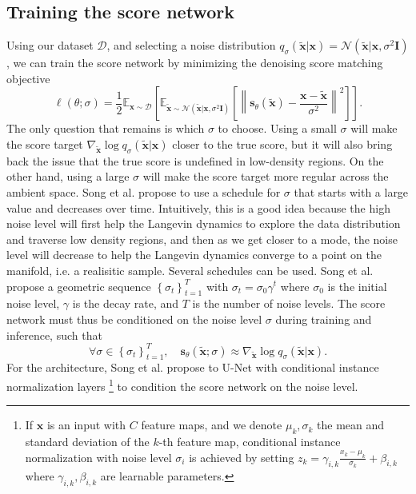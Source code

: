 \documentclass{article}
\begin{document}
\subsection{Training the score network}
Using our dataset $\mathcal{D}$, and selecting a noise distribution $q_\sigma(\tilde {\mathbf{x}}|\mathbf{x}) = \mathcal{N}(\tilde {\mathbf{x}}|\mathbf{x}, \sigma^2 \mathbf{I})$,
we can train the score network by minimizing the denoising score matching objective
\begin{equation}
    \label{eq:score-empirical}
    \ell(\theta; \sigma) = \frac{1}{2} \mathbb{E}_{\mathbf{x}\sim \mathcal{D}} \left[ \mathbb{E}_{\tilde {\mathbf{x}}\sim \mathcal{N}(\tilde {\mathbf{x}}|\mathbf{x}, \sigma^2 \mathbf{I})} \left[ \left\| \mathbf{s}_\theta(\tilde {\mathbf{x}}) - \frac{\mathbf{x} - \tilde {\mathbf{x}}}{\sigma^2} \right\|^2 \right] \right].
\end{equation}
The only question that remains is which $\sigma$ to choose. Using a small $\sigma$ will make the score target $\nabla_{\tilde {\mathbf{x}}} \log q_\sigma(\tilde {\mathbf{x}}|\mathbf{x})$
closer to the true score, but it will also bring back the issue that the true score is undefined in low-density regions. On the other hand, using a large $\sigma$ will make the
score target more regular across the ambient space. Song et al. propose to use a schedule for $\sigma$ that starts with a large value and decreases over time. Intuitively, this 
is a good idea because the high noise level will first help the Langevin dynamics to explore the data distribution and traverse low density regions, and then as we get closer to 
a mode, the noise level will decrease to help the Langevin dynamics converge to a point on the manifold, i.e. a realisitic sample.
Several schedules can be used. Song et al. propose a geometric sequence $\left \{ \sigma_t \right \}_{t=1}^T$ with $\sigma_t = \sigma_0 \gamma^t$ where $\sigma_0$ is the initial 
noise level, $\gamma$ is the decay rate, and $T$ is the number of noise levels.
The score network must thus be conditioned on the noise level $\sigma$ during training and inference, such that
\begin{equation}
    \forall \sigma \in \left \{ \sigma_t \right \}_{t=1}^T, \quad \mathbf{s}_\theta(\tilde {\mathbf{x}}; \sigma) \approx \nabla_{\tilde {\mathbf{x}}} \log q_\sigma(\tilde {\mathbf{x}}|\mathbf{x}).
\end{equation}
For the architecture, Song et al. propose to U-Net with conditional instance normalization layers
\footnote{If $\mathbf{x}$ is an input with $C$ feature maps, and we denote $\mu_k, \sigma_k$ the mean and standard deviation of the $k$-th feature map, conditional instance 
normalization with noise level $\sigma_i$ is achieved by setting $z_k = \gamma_{i,k} \frac{x_k - \mu_k}{\sigma_k} + \beta_{i,k}$ where $\gamma_{i,k}, \beta_{i,k}$ are
learnable parameters.}
to condition the score network on the noise level.
\end{document}
